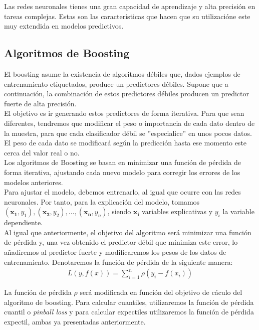 \documentclass[11pt]{book}
\theoremstyle{plain} %
\theoremstyle{definition} %
\begin{document}
Las redes neuronales tienes una gran capacidad de aprendizaje y alta precisión en 
tareas complejas. Estas son las características que hacen que su utilizacióne este muy 
extendida en modelos predictivos.\\

\subsection{Algoritmos de Boosting}
El boosting asume la existencia de algoritmos débiles que, dados ejemplos de 
entrenamiento etiquetados, produce un predictores débiles. Supone que a continuación, 
la combinación de estos predictores débiles producen un predictor fuerte de alta precisión.\\

El objetivo es ir generando estos predictores de forma iterativa. Para que sean diferentes, 
tendremos que modificar el peso o importancia de cada dato dentro de la muestra, 
para que cada clasificador débil se ''especialice'' en unos pocos datos. El peso de cada 
dato se modificará según la predicción hasta ese momento este cerca del valor real o no. \\

Los algoritmos de Boosting se basan en minimizar una función de pérdida de forma 
iterativa, ajustando cada nuevo modelo para corregir los errores de los modelos anteriores.\\

Para ajustar el modelo, debemos entrenarlo, al igual que ocurre con las redes 
neuronales. Por tanto, para la explicación del modelo, tomamos 
$(\mathbf{x_1}, y_1), (\mathbf{x_2}, y_2), \dots, (\mathbf{x_n}, y_n)$, siendo $\mathbf{x_i}$ 
variables explicativas y $y_i$ la variable dependiente. \\

Al igual que anteriormente, el objetivo del algoritmo será minimizar una función de pérdida 
y, una vez obtenido el predictor débil que minimiza este error, lo añadiremos al predictor 
fuerte y modificaremos los pesos de los datos de entrenamiento. Denotaremos la 
función de pérdida de la siguiente manera:
\begin{align*}
   L(y, f(x)) =\sum_{i=1}^n \rho(y_i-f(x_i))
\end{align*}

La función de pérdida $\rho$ será modificada en función del objetivo de cáculo 
del algoritmo de boosting. Para calcular cuantiles, utilizaremos la función de pérdida 
cuantil o \textit{pinball loss} y para calcular expectiles utilizaremos la función de pérdida 
expectil, ambas ya presentadas anteriormente.\\
\end{document}
